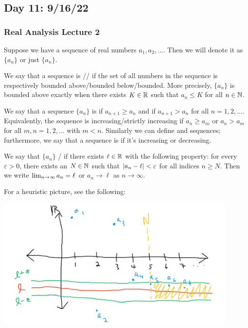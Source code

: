 \documentclass[main.tex]{subfiles}
\begin{document}
\subsection{Day 11: 9/16/22}
\subsubsection{Real Analysis Lecture 2}

\begin{definition}
    Suppose we have a sequence of real numbers $a_1, a_2, \ldots$. Then we will denote it as $\{a_n\}$ or just $\{a_n\}$.
\end{definition}    

\begin{definition}
    We say that a sequence is // if the set of all numbers in the sequence is respectively bounded above/bounded below/bounded. More precisely, $\{a_n\}$ is bounded above exactly when there exists $K\in \mathbb R$ such that $a_n\le K$ for all $n\in \mathbb N$.
\end{definition}

\begin{definition}
    We say that a sequence $\{a_n\}$ is  if $a_{n + 1}\ge a_n$ and  if $a_{n + 1} > a_n$ for all $n = 1, 2, \ldots$. Equivalently, the sequence is increasing/strictly increasing if $a_n \ge a_m$ or $a_n > a_m$ for all $m, n = 1, 2, \ldots$ with $m < n$. Similarly we can define  and  sequences; furthermore, we say that a sequence is  if it's increasing or decreasing.
\end{definition}

\begin{definition}[Convergence]
    We say that $\{a_n\}$ / if there exists $\ell \in \mathbb R$ with the following property: for every $\varepsilon > 0$, there exists an $N\in \mathbb N$ such that $\left\lvert a_n - \ell \right\rvert < \varepsilon$ for all indices $n\ge N$. Then we write $\lim_{n\to \infty} a_n = \ell$ or $a_n\to \ell$ as $n\to \infty$.
\end{definition}

For a heuristic picture, see the following:

\begin{center}
    \includegraphics[width = 0.9\textwidth]{limits.JPG}
\end{center}
\end{document}
